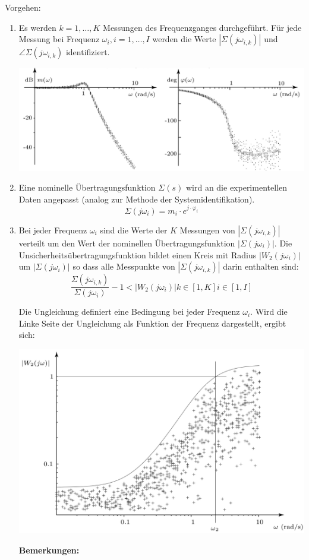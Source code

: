                    Vorgehen:
                    \begin{enumerate}
                        \item Es werden $k = 1,\hdots,K$ Messungen des Frequenzganges durchgeführt. Für jede Messung bei Frequenz $\omega_i, i =1,\hdots,I$ werden die Werte $|\Sigma(j\omega_{i,k})|$ und $\angle\Sigma(j\omega_{i,k})$ identifiziert.
                        \begin{center}
                            \includegraphics[width = 0.8\linewidth]{images/05/Unsicherheits_Messung.jpg}
                        \end{center}
                        \item Eine nominelle Übertragungsfunktion $\Sigma(s)$ wird an die experimentellen Daten angepasst (analog zur Methode der Systemidentifikation).
                        \[\Sigma(j\omega_i) = m_i \cdot e^{j\cdot\varphi_i}\]
                        \item  Bei jeder Frequenz $\omega_i$ sind die Werte der $K$ Messungen von $|\Sigma(j\omega_{i,k})|$ verteilt um den Wert der nominellen Übertragungsfunktion $|\Sigma(j\omega_i)|$. Die Unsicherheitsübertragungsfunktion bildet einen Kreis mit Radius $|W_2(j\omega_i)|$ um $|\Sigma(j\omega_i)|$ so dass alle Messpunkte von $|\Sigma(j\omega_{i,k})|$ darin enthalten sind:
                        \[\frac{\Sigma(j\omega_{i,k})}{\Sigma(j\omega_i)}-1 < |W_2(j\omega_i)|k\in [1,K] i \in[1,I]\]
                        
                        Die Ungleichung definiert eine Bedingung bei jeder Frequenz $\omega_i$. Wird die Linke Seite der Ungleichung als Funktion der Frequenz dargestellt, ergibt sich:
                        \begin{center}
                            \includegraphics[width = 0.65\linewidth]{images/05/UnsicherheitsFunktion.jpg}
                        \end{center}
                        \textbf{Bemerkungen:} 
                        

\end{enumerate}
